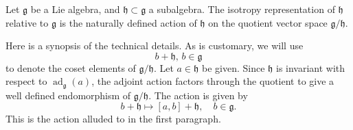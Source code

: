 \documentclass[12pt]{article}
\newcommand{\lag}{\mathfrak{g}}
\newcommand{\lah}{\mathfrak{h}}
\newcommand{\ad}{\mathop{\mathrm{ad}}\nolimits}
\begin{document}
Let $\lag$ be a Lie algebra, and $\lah\subset\lag$ a subalgebra.  The
isotropy representation of $\lah$ relative to $\lag$ is the naturally
defined action of $\lah$ on the quotient vector space $\lag/\lah$.

Here is a synopsis of the technical details. As is customary, we will
use  
$$b+\lah,\, b\in\lag$$
to denote the coset elements of $\lag/\lah$.
Let $a\in\lah$ be given.  Since $\lah$ is invariant with respect to
$\ad_\lag(a)$, the adjoint action factors through the quotient to
give a well defined endomorphism of $\lag/\lah$. The action is given
by
$$b+\lah \mapsto [a,b]+\lah,\quad b\in\lag.$$
This is the action
alluded to in the first paragraph.
\end{document}
